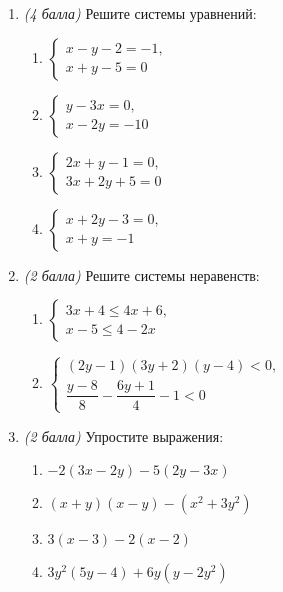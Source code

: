 \documentclass[12pt, a4paper]{article}
\begin{document}
	
	
		\begin{enumerate}
			\item \textit{(4 балла)} Решите системы уравнений:
			\begin{enumerate}[label=\asbuk*)]
				\item 
				$\left\{
				\begin{array}{l}
					x-y-2=-1,\\
					x+y-5=0
				\end{array}
				\right.$
				\item 
				$\left\{
				\begin{array}{l}
					y-3x=0,\\
					x-2y=-10
				\end{array}
				\right.$
				\item 
				$\left\{
				\begin{array}{l}
					2x+y-1=0,\\
					3x+2y+5=0
				\end{array}
				\right.$
				\item 
				$\left\{
				\begin{array}{l}
					x+2y-3=0,\\
					x+y=-1
				\end{array}
				\right.$ 
			\end{enumerate}
		\item \textit{(2 балла)} Решите системы неравенств:
		\begin{multicols}{2}
			\begin{enumerate}[label=\asbuk*)]
				\item 
				$\left\{
				\begin{array}{l}
					3x+4\leqslant4x+6,\\
					x-5\leqslant4-2x
				\end{array}
				\right.$
				\item 
				$\left\{
				\begin{array}{l}
					(2y-1)(3y+2)(y-4)<0,\\
					\dfrac{y-8}{8}-\dfrac{6y+1}{4}-1<0
				\end{array}
				\right.$
			\end{enumerate}
		\end{multicols}
		\item \textit{(2 балла)} Упростите выражения:
		\begin{multicols}{2}
			\begin{enumerate}[label=\asbuk*)]
				\item $-2(3x-2y)-5(2y-3x)$
				\item $(x+y)(x-y)-(x^2+3y^2)$
				\item $3(x-3)-2(x-2)$
				\item $3y^2(5y-4)+6y(y-2y^2)$
			\end{enumerate}
		\end{multicols}
	\end{enumerate}
	
\end{document}
